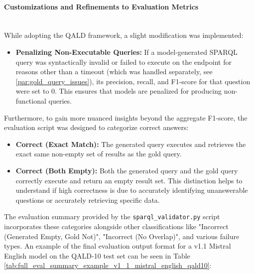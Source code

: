 \paragraph{Customizations and Refinements to Evaluation Metrics} \mbox{}\\
While adopting the QALD framework, a slight modification was implemented:
\begin{itemize}
    \item \textbf{Penalizing Non-Executable Queries:} If a model-generated SPARQL query was syntactically invalid or failed to execute on the endpoint for reasons other than a timeout (which was handled separately, see \ref{par:gold_query_issues}), its precision, recall, and F1-score for that question were set to 0. This ensures that models are penalized for producing non-functional queries.
\end{itemize}
Furthermore, to gain more nuanced insights beyond the aggregate F1-score, the evaluation script was designed to categorize correct answers:
\begin{itemize}
    \item \textbf{Correct (Exact Match):} The generated query executes and retrieves the exact same non-empty set of results as the gold query.
    \item \textbf{Correct (Both Empty):} Both the generated query and the gold query correctly execute and return an empty result set. 
    This distinction helps to understand if high correctness is due to accurately identifying unanswerable questions or accurately retrieving specific data.
\end{itemize}
The evaluation summary provided by the \texttt{sparql\_validator.py} script incorporates these categories alongside other classifications like "Incorrect (Generated Empty, Gold Not)", "Incorrect (No Overlap)", and various failure types. 
An example of the final evaluation output format for a v1.1 Mistral English model on the QALD-10 test set can be seen in Table \ref{tab:full_eval_summary_example_v1_1_mistral_english_qald10}:
